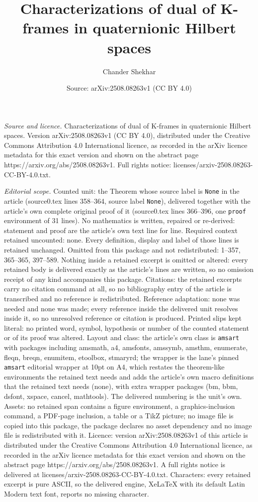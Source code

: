 \documentclass[10pt,a4paper]{amsart}
\title[Characterizations of dual of K-frames in quaternionic Hilber]{Characterizations of dual of K-frames in quaternionic Hilbert spaces}
\author{Chander Shekhar}
\date{Source: arXiv:2508.08263v1 (CC BY 4.0)}
\begin{document}
\maketitle

\noindent\emph{Source and licence.} Characterizations of dual of K-frames in quaternionic Hilbert spaces. Version arXiv:2508.08263v1 (CC BY 4.0), distributed under the Creative Commons Attribution 4.0 International licence, as recorded in the arXiv licence metadata for this exact version and shown on the abstract page https://arxiv.org/abs/2508.08263v1. Full rights notice: licenses/arxiv-2508.08263-CC-BY-4.0.txt.\par\smallskip

\noindent\textit{Editorial scope.} Counted unit: the Theorem whose source label is \texttt{None} in the article (source0.tex lines 358--364, source label \texttt{None}), delivered together with the article's own complete original proof of it (source0.tex lines 366--396, one \texttt{proof} environment of 31 lines). No mathematics is written, repaired or re-derived: statement and proof are the article's own text line for line. Required context retained uncounted: none. Every definition, display and label of those lines is retained unchanged. Omitted from this package and not redistributed: 1--357, 365--365, 397--589. Nothing inside a retained excerpt is omitted or altered: every retained body is delivered exactly as the article's lines are written, so no omission receipt of any kind accompanies this package. Citations: the retained excerpts carry no citation command at all, so no bibliography entry of the article is transcribed and no reference is redistributed. Reference adaptation: none was needed and none was made; every reference inside the delivered unit resolves inside it, so no unresolved reference or citation is produced. Printed slips kept literal: no printed word, symbol, hypothesis or number of the counted statement or of its proof was altered. Layout and class: the article's own class is \texttt{amsart} with packages including amsmath, a4, amsfonts, amssymb, amsthm, enumerate, fleqn, breqn, enumitem, etoolbox, stmaryrd; the wrapper is the lane's pinned \texttt{amsart} editorial wrapper at 10pt on A4, which restates the theorem-like environments the retained text needs and adds the article's own macro definitions that the retained text needs (none), with extra wrapper packages (bm, bbm, dsfont, xspace, cancel, mathtools). The delivered numbering is the unit's own. Assets: no retained span contains a figure environment, a graphics-inclusion command, a PDF-page inclusion, a table or a TikZ picture; no image file is copied into this package, the package declares no asset dependency and no image file is redistributed with it. Licence: version arXiv:2508.08263v1 of this article is distributed under the Creative Commons Attribution 4.0 International licence, as recorded in the arXiv licence metadata for this exact version and shown on the abstract page https://arxiv.org/abs/2508.08263v1. A full rights notice is delivered at licenses/arxiv-2508.08263-CC-BY-4.0.txt. Characters: every retained excerpt is pure ASCII, so the delivered engine, XeLaTeX with its default Latin Modern text font, reports no missing character.
\end{document}
